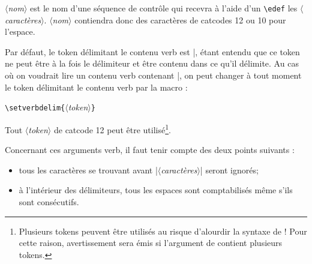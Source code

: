 \documentclass[a4paper,10pt,french]{article}
\newcommand\guill[1]{\og{}#1\fg{}}
\newcommand\argu[1]{$\langle$\textit{#1}$\rangle$}
\newcommand\ARGU[1]{\texttt{\color{black}\{}\argu{#1}\texttt{\color{black}\}}}
\begin{document}
\argu{nom} est le nom d'une séquence de contrôle qui recevra à l'aide d'un \verb|\edef| les \argu{caractères}. \argu{nom} contiendra donc des caractères de catcodes 12 ou 10 pour l'espace.\medskip

Par défaut, le token délimitant le contenu verb est \guill{|}, étant entendu que ce token ne peut être à la fois le délimiteur et être contenu dans ce qu'il délimite. Au cas où on voudrait lire un contenu verb contenant \guill{|}, on peut changer à tout moment le token délimitant le contenu verb par la macro :\par\medskip
\hfill\verb|\setverbdelim|\ARGU{token}\hfill{}\smallskip

Tout \argu{token} de catcode 12 peut être utilisé\footnote{Plusieurs tokens peuvent être utilisés au risque d'alourdir la syntaxe de \texttt{\string\verbtocs} ! Pour cette raison, avertissement sera émis si l'argument de \texttt{\string\setverbdelim} contient plusieurs tokens.}.\medskip

Concernant ces arguments verb, il faut tenir compte des deux points suivants :
\begin{itemize}
	\item tous les caractères se trouvant avant |\argu{caractères}| seront ignorés;
	\item à l'intérieur des délimiteurs, tous les espaces sont comptabilisés même s'ils sont consécutifs.
\end{itemize}
\medskip
\end{document}

